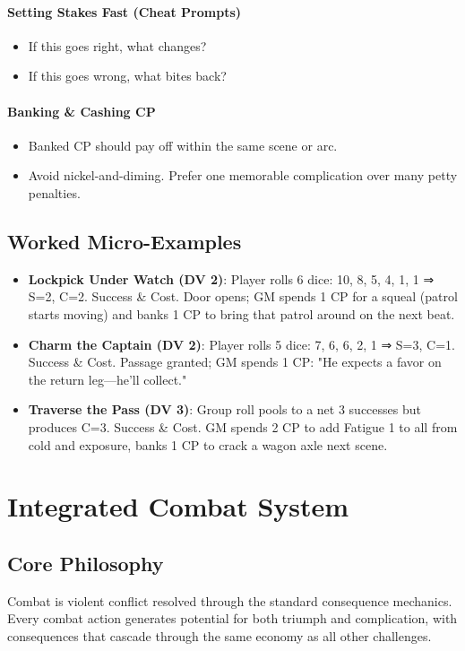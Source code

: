 \documentclass[11pt]{article}
\begin{document}
\paragraph{Setting Stakes Fast (Cheat Prompts)}
\begin{itemize}
    \item If this goes right, what changes?
    \item If this goes wrong, what bites back?
\end{itemize}

\paragraph{Banking \& Cashing CP}
\begin{itemize}
    \item Banked CP should pay off within the same scene or arc.
    \item Avoid nickel-and-diming. Prefer one memorable complication over many petty penalties.
\end{itemize}

\subsection{Worked Micro-Examples}
\begin{itemize}
    \item \textbf{Lockpick Under Watch (DV 2)}: Player rolls 6 dice: 10, 8, 5, 4, 1, 1 ⇒ S=2, C=2. Success \& Cost. Door opens; GM spends 1 CP for a squeal (patrol starts moving) and banks 1 CP to bring that patrol around on the next beat.
    \item \textbf{Charm the Captain (DV 2)}: Player rolls 5 dice: 7, 6, 6, 2, 1 ⇒ S=3, C=1. Success \& Cost. Passage granted; GM spends 1 CP: "He expects a favor on the return leg—he'll collect."
    \item \textbf{Traverse the Pass (DV 3)}: Group roll pools to a net 3 successes but produces C=3. Success \& Cost. GM spends 2 CP to add Fatigue 1 to all from cold and exposure, banks 1 CP to crack a wagon axle next scene.
\end{itemize}

\section{Integrated Combat System}

\subsection{Core Philosophy}
Combat is violent conflict resolved through the standard consequence mechanics. Every combat action generates potential for both triumph and complication, with consequences that cascade through the same economy as all other challenges.
\end{document}
